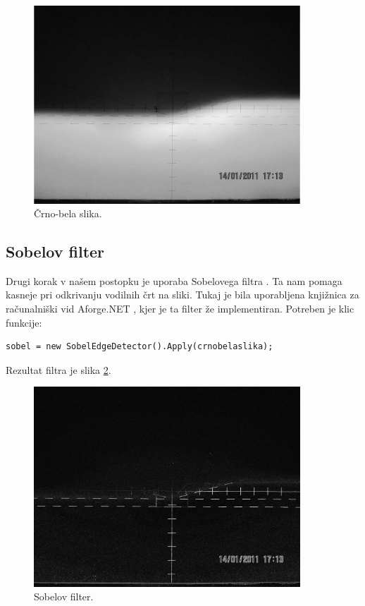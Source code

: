 \documentclass[oneside, a4paper, 12pt]{book}
\begin{document}
\begin{figure}
\begin{center}
\includegraphics[width=10cm]{slike/crno-bela-slika.jpg}
\end{center}
\caption{Črno-bela slika.}
\label{pic:bw}
\end{figure}

\subsection{Sobelov filter}
\label{ch:sobel}
Drugi korak v našem postopku je uporaba Sobelovega filtra \cite{sobel-wiki}. Ta nam pomaga kasneje pri odkrivanju  vodilnih črt na sliki. Tukaj je bila uporabljena knjižnica za računalniški vid Aforge.NET \cite{sobel}, kjer je ta filter že implementiran. Potreben je klic funkcije:
\begin{verbatim}
sobel = new SobelEdgeDetector().Apply(crnobelaslika);
\end{verbatim}

Rezultat filtra je slika \ref{pic:sobel}.

\begin{figure}
\begin{center}
\includegraphics[width=10cm]{slike/sobel.jpg}
\end{center}
\caption{Sobelov filter.}
\label{pic:sobel}
\end{figure}
\end{document}
